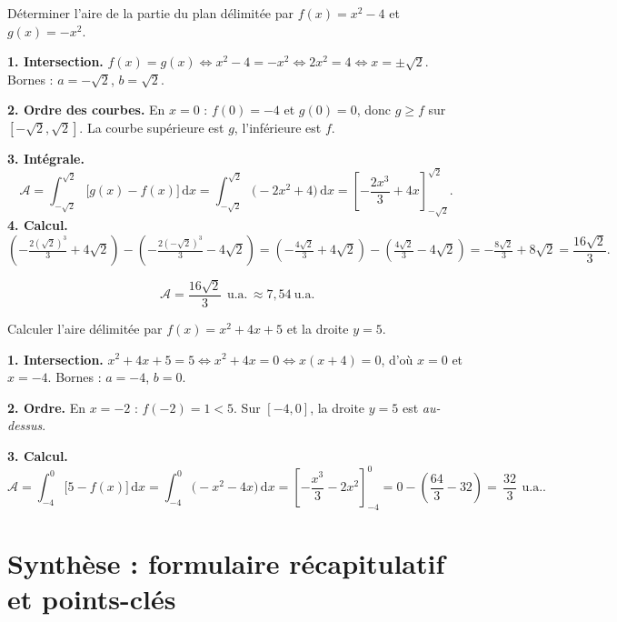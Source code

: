 \documentclass[11pt,a4paper]{article}
\newcommand{\dd}{\mathrm{d}}
\newcommand{\ua}{\,\text{u.a.}}   %
\begin{document}
\begin{exemple}
Déterminer l'aire de la partie du plan délimitée par $f(x)=x^2-4$ et $g(x)=-x^2$.

\smallskip
\textbf{1. Intersection.} $f(x)=g(x)\Leftrightarrow x^2-4=-x^2\Leftrightarrow 2x^2=4
\Leftrightarrow x=\pm\sqrt2$. Bornes : $a=-\sqrt2$, $b=\sqrt2$.

\textbf{2. Ordre des courbes.} En $x=0$ : $f(0)=-4$ et $g(0)=0$, donc $g\geqslant f$ sur
$[-\sqrt2,\sqrt2]$. La courbe supérieure est $g$, l'inférieure est $f$.

\textbf{3. Intégrale.}
\[
\mathcal{A}=\int_{-\sqrt2}^{\sqrt2}\bigl[g(x)-f(x)\bigr]\,\dd x
=\int_{-\sqrt2}^{\sqrt2}\bigl(-2x^2+4\bigr)\,\dd x
=\left[-\frac{2x^3}{3}+4x\right]_{-\sqrt2}^{\sqrt2}.
\]
\textbf{4. Calcul.}
$\left(-\tfrac{2(\sqrt2)^3}{3}+4\sqrt2\right)-\left(-\tfrac{2(-\sqrt2)^3}{3}-4\sqrt2\right)
=\left(-\tfrac{4\sqrt2}{3}+4\sqrt2\right)-\left(\tfrac{4\sqrt2}{3}-4\sqrt2\right)
=-\tfrac{8\sqrt2}{3}+8\sqrt2=\dfrac{16\sqrt2}{3}.$

\[
\boxed{\,\mathcal{A}=\dfrac{16\sqrt2}{3}\ \ua\,\approx 7{,}54\ \text{u.a.}}
\]
\end{exemple}

\begin{exemple}
Calculer l'aire délimitée par $f(x)=x^2+4x+5$ et la droite $y=5$.

\smallskip
\textbf{1. Intersection.} $x^2+4x+5=5\Leftrightarrow x^2+4x=0\Leftrightarrow x(x+4)=0$, d'où
$x=0$ et $x=-4$. Bornes : $a=-4$, $b=0$.

\textbf{2. Ordre.} En $x=-2$ : $f(-2)=1<5$. Sur $[-4,0]$, la droite $y=5$ est \emph{au-dessus}.

\textbf{3. Calcul.}
\[
\mathcal{A}=\int_{-4}^{0}\bigl[5-f(x)\bigr]\,\dd x=\int_{-4}^{0}\bigl(-x^2-4x\bigr)\,\dd x
=\left[-\frac{x^3}{3}-2x^2\right]_{-4}^{0}
=0-\left(\frac{64}{3}-32\right)=\boxed{\,\dfrac{32}{3}\ \ua.\,}
\]
\end{exemple}

\section{Synthèse : formulaire récapitulatif et points-clés}
\end{document}
